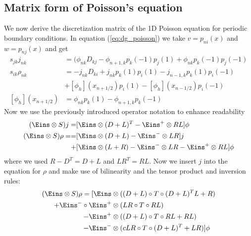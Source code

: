 \documentclass[a4paper,12pt]{scrartcl}
\begin{document}
\subsection{Matrix form of Poisson's equation}
We now derive the discretization matrix of the 1D Poisson equation for periodic
boundary conditions.
In equation (\ref{eq:dg_poisson}) we take $v=p_{ni}(x)$ and  $w=p_{nj}(x)$ 
and get
\begin{subequations}
    \begin{align}
        s_{jk} j_{nk} &=  (\phi_{nk}D_{kj} - \phi_{n+1,k}p_k(-1)p_j(1) + \phi_{nk}p_k(-1)p_j(-1)\\
        s_{ik} \rho_{nk} &= -j_{nk} D_{ki} + j_{nk}p_k(1)p_i(1) - j_{n-1,k}p_k(1)p_i(-1) \nonumber \\
         &+ [\phi_h](x_{n+1/2}) p_i(1) - [\phi_h](x_{n-1/2})p_i(-1) \\
        [\phi_h](x_{n+1/2}) &= \phi_{nk}p_k(1) - \phi_{n+1,k}p_k(-1)
        \label{ eq:projection}
    \end{align}
\end{subequations}
Now we use the previously introduced operator notation to enhance readability
\begin{subequations}
    \begin{align}
        (\Eins \otimes S)j =& [\Eins\otimes (D+L)^T - \Eins^{+} \otimes RL] \phi \\
        (\Eins \otimes S)\rho =%
                =& [\Eins\otimes (D+L) - \Eins^-\otimes LR]j \nonumber \\
                +& [\Eins\otimes (L+R) - \Eins^{-}\otimes LR  - \Eins^{+} \otimes RL] \phi
    \end{align}
    \label{eq:projection_operator_notation}
\end{subequations}
where we used $R-D^T = D+L$ and $LR^T = RL$. Now we insert $j$ into the equation
for $\rho$ and make use of bilinearity and the tensor product and inversion rules:
\begin{align}
    (\Eins\otimes S)\rho = 
    [\Eins&\otimes( (D+L)\circ T\circ (D+L)^T  L + R) \nonumber \\
            + \Eins^-\circ\Eins^+&\otimes (LR\circ T\circ RL) \nonumber \\
            - \Eins^+&\otimes ((D+L)\circ T \circ RL + RL) \nonumber \\
            - \Eins^-&\otimes (cLR\circ T\circ (D+L)^T + LR )]\phi
    \label{eq:laplace_operator}
\end{align}
\end{document}
